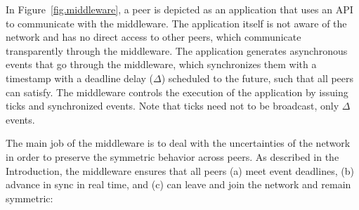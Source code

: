 \documentclass[sn-mathphys,iicol]{sn-jnl}%
\begin{document}
In Figure~\ref{fig.middleware}, a peer is depicted as an application that uses
an API to communicate with the middleware.
The application itself is not aware of the network and has no direct access to
other peers, which communicate transparently through the middleware.
The application generates asynchronous events that go through the middleware,
which synchronizes them with a timestamp with a deadline delay ($\Delta$)
scheduled to the future, such that all peers can satisfy.
The middleware controls the execution of the application by issuing ticks and
synchronized events.
Note that ticks need not to be broadcast, only $\Delta$ events.

The main job of the middleware is to deal with the uncertainties of the
network in order to preserve the symmetric behavior across peers.
As described in the Introduction, the middleware ensures that all peers
    (a) meet event deadlines,
    (b) advance in sync in real time, and
    (c) can leave and join the network and remain symmetric:
%
\end{document}
